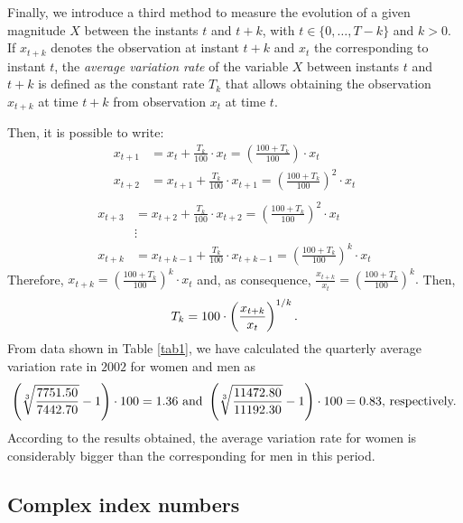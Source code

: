 \noindent Finally, we introduce a third method to measure the evolution of a given magnitude $X$ between the instants $t$ and $t+k$, with $t \in \{0,\dots,T-k\}$ and $k>0$.  If $x_{t+k}$ denotes the observation at instant $t+k$ and $x_t$ the corresponding to instant $t$, the \emph{average variation rate} of the variable $X$ between instants $t$ and $t+k$ is defined as the constant rate $T_k$ that allows obtaining the observation $x_{t+k}$ at time $t+k$ from observation $x_t$ at time $t$. 

Then, it is possible to write:
\begin{equation*}
\begin{split}
x_{t+1}&=x_t+\frac{T_k}{100}\cdot x_t=\left(\frac{100+T_k}{100}\right)\cdot x_t\\
x_{t+2}&=x_{t+1}+\frac{T_k}{100}\cdot x_{t+1}=\left(\frac{100+T_k}{100}\right)^2\cdot x_t\\
\end{split}
\end{equation*}
\begin{equation*}
\begin{split}
x_{t+3}&=x_{t+2}+\frac{T_k}{100}\cdot x_{t+2}=\left(\frac{100+T_k}{100}\right)^2\cdot x_t\\
& \vdots\\
x_{t+k}&=x_{t+k-1}+\frac{T_k}{100}\cdot x_{t+k-1}=\left(\frac{100+T_k}{100}\right)^k\cdot x_t
\end{split}
\end{equation*}\vspace*{-0.05 cm}
Therefore, $x_{t+k}=\left(\frac{100+T_k}{100}\right)^k \cdot x_t$ and, as consequence, $\frac{x_{t+k}}{x_t}=\left(\frac{100+T_k}{100}\right)^k.$ Then,\vspace*{-0.05 cm}
$$T_k=100\cdot\left(\frac{x_{t+k}}{x_t} \right)^{1/k}.\vspace*{-0.05 cm}$$
From data shown in Table \ref{tab1},  we have calculated the quarterly average variation rate in $2002$ for women and men as\vspace*{-0.05 cm}
 $$\left(\sqrt[3]{\frac{7751.50}{7442.70}}-1\right)\cdot 100 = 1.36 \mbox{ and }\left(\sqrt[3]{\frac{11472.80}{11192.30}}-1\right)\cdot 100=0.83\mbox{, respectively.}\vspace*{-0.05 cm}$$According to the results obtained, the average variation rate for women is considerably bigger than the corresponding for men in this period.
 

\subsection{Complex index numbers}\label{cin}

